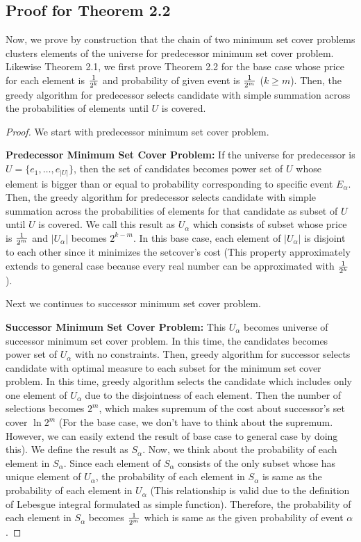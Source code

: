 \subsection{Proof for Theorem 2.2}
Now, we prove by construction that the chain of two minimum set cover problems clusters elements of the universe 
for predecessor minimum set cover problem.
Likewise Theorem 2.1, we first prove Theorem 2.2 for the base case whose price for each element is ${1 \over 2^k}$ 
and probability of given event is ${1 \over 2^m}$ ($k \geq m$).
Then, the greedy algorithm for predecessor selects candidate with simple summation 
across the probabilities of elements until $U$ is covered. 
\begin{proof} We start with predecessor minimum set cover problem.  

\textbf{Predecessor Minimum Set Cover Problem: } If the universe for predecessor is $U=\{e_1,\ldots,e_{|U|}\}$, 
then the set of candidates becomes power set of $U$ whose element is bigger than or equal to probability corresponding to specific event $E_\alpha$. 
Then, the greedy algorithm for predecessor selects candidate with simple summation across the probabilities of elements 
for that candidate as subset of $U$ until $U$ is covered. 
We call this result as $U_\alpha$ which consists of subset whose price is ${1 \over 2^m}$ and $|U_\alpha|$ becomes $2^{k-m}$.
In this base case, each element of $|U_{\alpha}|$ is disjoint to each other since it minimizes the setcover's cost 
(This property approximately extends to general case because every real number can be approximated with ${1 \over 2^k}$).

Next we continues to successor minimum set cover problem.

\textbf{Successor Minimum Set Cover Problem: }
This $U_\alpha$ becomes universe of successor minimum set cover problem.
In this time, the candidates becomes power set of $U_\alpha$ with no constraints.
Then, greedy algorithm for successor selects candidate with optimal measure to each subset for the minimum set cover problem.
In this time, greedy algorithm selects the candidate which includes only one element of $U_{\alpha}$ due to the disjointness of each element.
Then the number of selections becomes $2^m$, which makes supremum of the cost about successor’s set cover $\ln 2^m$ 
(For the base case, we don’t have to think about the supremum. However, we can easily extend the result of base case to general case by doing this).
We define the result as $S_{\alpha}$.
Now, we think about the probability of each element in $S_{\alpha}$.
Since each element of $S_{\alpha}$ consists of the only subset whose has unique element of $U_{\alpha}$, 
the probability of each element in $S_{\alpha}$ is same as the probability of each element in $U_{\alpha}$ 
(This relationship is valid due to the definition of Lebesgue integral formulated as simple function).
Therefore, the probability of each element in $S_{\alpha}$ becomes ${1 \over 2^m}$ which is same as the given probability of event $\alpha$.


\end{proof}
